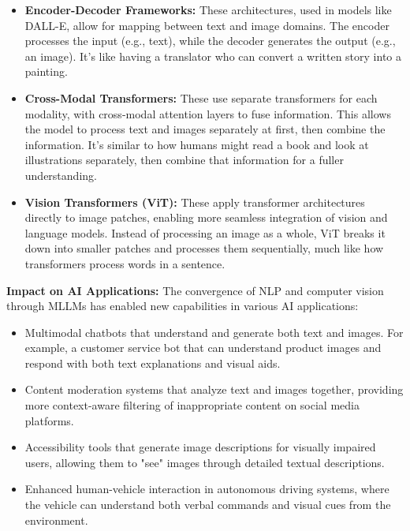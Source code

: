 \begin{itemize}
    \item \textbf{Encoder-Decoder Frameworks:} These architectures, used in models like DALL-E, allow for mapping between text and image domains. The encoder processes the input (e.g., text), while the decoder generates the output (e.g., an image). It's like having a translator who can convert a written story into a painting.
    
    \item \textbf{Cross-Modal Transformers:} These use separate transformers for each modality, with cross-modal attention layers to fuse information. This allows the model to process text and images separately at first, then combine the information. It's similar to how humans might read a book and look at illustrations separately, then combine that information for a fuller understanding.
    
    \item \textbf{Vision Transformers (ViT):} These apply transformer architectures directly to image patches, enabling more seamless integration of vision and language models. Instead of processing an image as a whole, ViT breaks it down into smaller patches and processes them sequentially, much like how transformers process words in a sentence.
\end{itemize}

\textbf{Impact on AI Applications:}
The convergence of NLP and computer vision through MLLMs has enabled new capabilities in various AI applications:

\begin{itemize}
    \item Multimodal chatbots that understand and generate both text and images. For example, a customer service bot that can understand product images and respond with both text explanations and visual aids.
    \item Content moderation systems that analyze text and images together, providing more context-aware filtering of inappropriate content on social media platforms.
    \item Accessibility tools that generate image descriptions for visually impaired users, allowing them to "see" images through detailed textual descriptions.
    \item Enhanced human-vehicle interaction in autonomous driving systems, where the vehicle can understand both verbal commands and visual cues from the environment.
\end{itemize}

